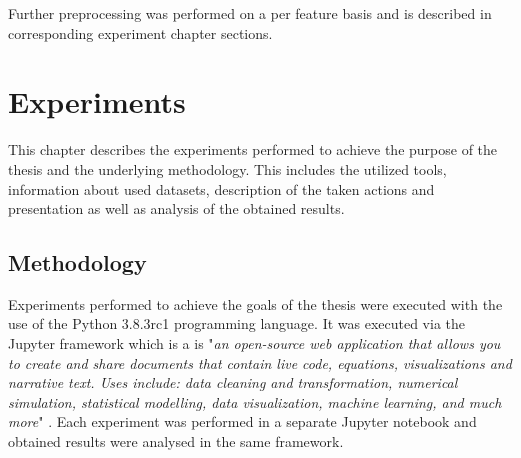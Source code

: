 \documentclass[a4paper,twoside,12pt]{book}
\begin{document}
Further preprocessing was performed on a per feature basis and is described in corresponding
experiment chapter sections.



\chapter{Experiments}

This chapter describes the experiments performed to achieve the purpose of the thesis
and the underlying methodology. This includes the utilized tools, information about used datasets,
description of the taken actions and presentation as well as analysis of the obtained results. 


\section{Methodology}

Experiments performed to achieve the goals of the thesis were executed with the use of 
the Python 3.8.3rc1 programming language. It was executed via the Jupyter framework which is
a is "\textit{an open-source web application that allows you to create and share documents that 
contain live code, equations, visualizations and narrative text. Uses include: data cleaning 
and transformation, numerical simulation, statistical modelling, data visualization, machine 
learning, and much more}" \cite{bib:jupyter}. Each experiment was performed in a separate
Jupyter notebook and obtained results were analysed in the same framework. 
\end{document}
